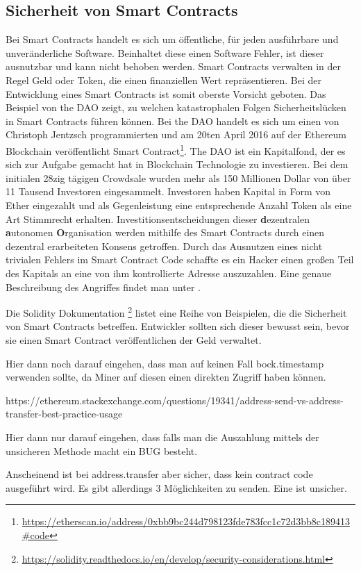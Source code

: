\subsection{Sicherheit von Smart Contracts}
Bei Smart Contracts handelt es sich um öffentliche, für jeden ausführbare und unveränderliche Software. Beinhaltet diese einen Software Fehler, ist dieser ausnutzbar und kann nicht behoben werden. Smart Contracts verwalten in der Regel Geld oder Token, die einen finanziellen Wert repräsentieren. Bei der Entwicklung eines Smart Contracts ist somit oberste Vorsicht geboten. Das Beispiel von the DAO zeigt, zu welchen katastrophalen Folgen Sicherheitslücken in Smart Contracts führen können.
Bei the DAO handelt es sich um einen von Christoph Jentzsch programmierten und am 20ten April 2016 auf der Ethereum Blockchain veröffentlicht Smart Contract\footnote{\url{https://etherscan.io/address/0xbb9bc244d798123fde783fcc1c72d3bb8c189413\#code}}.
The DAO ist ein Kapitalfond, der es sich zur Aufgabe gemacht hat in Blockchain Technologie zu investieren. Bei dem initialen 28zig tägigen Crowdsale wurden mehr als 150 Millionen Dollar von über 11 Tausend Investoren eingesammelt. Investoren haben Kapital in Form von Ether eingezahlt und als Gegenleistung eine entsprechende Anzahl Token als eine Art Stimmrecht erhalten. Investitionsentscheidungen dieser \textbf{d}ezentralen \textbf{a}utonomen \textbf{O}rganisation werden mithilfe des Smart Contracts durch einen dezentral erarbeiteten Konsens getroffen. Durch das Ausnutzen eines nicht trivialen Fehlers im Smart Contract Code schaffte es ein Hacker einen großen Teil des Kapitals an eine von ihm kontrollierte Adresse auszuzahlen. Eine genaue Beschreibung des Angriffes findet man unter \cite{eth_dao_hack}.

Die Solidity Dokumentation \footnote{\url{https://solidity.readthedocs.io/en/develop/security-considerations.html}} listet eine Reihe von Beispielen, die die Sicherheit von Smart Contracts betreffen. Entwickler sollten sich dieser bewusst sein, bevor sie einen Smart Contract veröffentlichen der Geld verwaltet.


\if
Hier dann noch darauf eingehen, dass man auf keinen Fall bock.timestamp verwenden sollte, da Miner auf diesen einen direkten Zugriff haben können.

https://ethereum.stackexchange.com/questions/19341/address-send-vs-address-transfer-best-practice-usage

Hier dann nur darauf eingehen, dass falls man die Auszahlung mittels der unsicheren Methode macht ein BUG besteht. 

Anscheinend ist bei address.transfer aber sicher, dass kein contract code ausgeführt wird. Es gibt allerdings 3 Möglichkeiten zu senden.
Eine ist unsicher.


\fi
